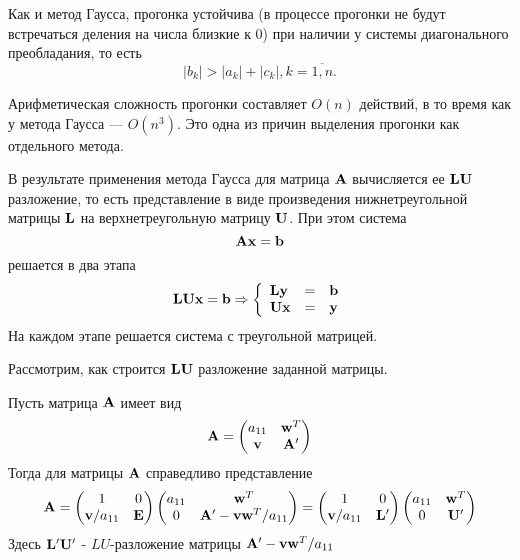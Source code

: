 \documentclass[professionalfonts,compress,unicode]{beamer}
\begin{document}
{
	Как и метод Гаусса, прогонка устойчива (в процессе прогонки не будут встречаться деления на числа близкие к 0) при наличии 
	у системы диагонального преобладания, то есть 
	$$|b_k| > |a_k| + |c_k|, k=\overline{1,n}.$$
	
	Арифметическая сложность прогонки составляет $O(n)$ действий, в то время как у метода Гаусса --- $O(n^3)$. Это одна из причин 
	выделения прогонки как отдельного метода.
}

{
	В результате применения метода Гаусса для матрица ${\bf A}$ вычисляется ее ${\bf L}{\bf U}$ разложение, то есть представление в виде произведения
	нижнетреугольной матрицы ${\bf L}$ на верхнетреугольную матрицу ${\bf U}$. При этом система
	$$
	{\bf A}{\bf x} = {\bf b}
	$$
	решается в два этапа
	$$
	{\bf L}{\bf U} {\bf x} = {\bf b} \Rightarrow \left\{ 
	\begin{array}{lcl}
	{\bf L} {\bf y} &=& {\bf b}\\
	{\bf U} {\bf x} &=& {\bf y}\\
	\end{array}
	\right.
	$$
	На каждом этапе решается система с треугольной матрицей.
}

{
	Рассмотрим, как строится ${\bf L}{\bf U}$ разложение заданной матрицы.
	
	Пусть матрица ${\bf A}$ имеет вид
	$$
	{\bf A} = \begin{pmatrix}
		a_{11}& {\bf w}^T\\
		{\bf v} & {\bf A}'\\
	\end{pmatrix}
	$$
	Тогда для матрицы ${\bf A}$ справедливо представление
	$$
	{\bf A} = 
	\begin{pmatrix}
		1&0\\
		{\bf v}/a_{11}&{\bf E}
	\end{pmatrix}
	\begin{pmatrix}
		a_{11}&{\bf w}^T\\
		0&{\bf A}' - {\bf v}{\bf w}^T/a_{11}
	\end{pmatrix} = 
	\begin{pmatrix}
		1&0\\
		{\bf v}/a_{11}&{\bf L}'
	\end{pmatrix}
	\begin{pmatrix}
		a_{11}&{\bf w}^T\\
		0&{\bf U}'
	\end{pmatrix}
	$$
	Здесь ${\bf L}'{\bf U}'$ - $LU$-разложение матрицы ${\bf A}' -{\bf v}{\bf w}^T/a_{11}$
}
\end{document}
